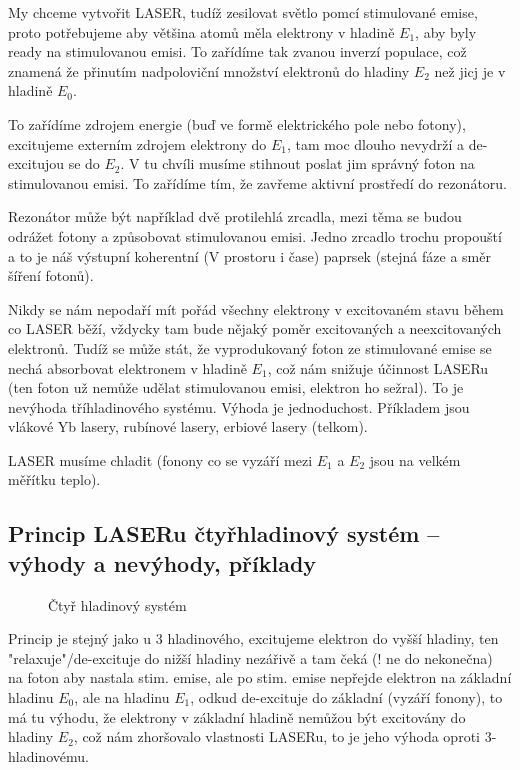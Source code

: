 \documentclass[a4paper, 12pt]{article}
\begin{document}
            My chceme vytvořit LASER, tudíž zesilovat světlo pomcí stimulované emise, proto potřebujeme aby většina atomů měla
            elektrony v hladině $E_1$, aby byly ready na stimulovanou emisi. To zařídíme tak zvanou inverzí populace,
            což znamená že přinutím nadpoloviční množství elektronů do hladiny $E_2$ než jicj je v hladině $E_0$.

            To zařídíme zdrojem energie (buď ve formě elektrického pole nebo fotony), excitujeme externím zdrojem elektrony
            do $E_1$, tam moc dlouho nevydrží a de-excitujou se do $E_2$. V tu chvíli musíme stihnout poslat jim správný foton
            na stimulovanou emisi. To zařídíme tím, že zavřeme aktivní prostředí do rezonátoru. 

            Rezonátor může být například dvě protilehlá zrcadla, mezi těma se budou odrážet fotony a způsobovat stimulovanou emisi.
            Jedno zrcadlo trochu propouští a to je náš výstupní koherentní (V prostoru i čase) paprsek (stejná fáze a směr šíření fotonů).

            Nikdy se nám nepodaří mít pořád všechny elektrony v excitovaném stavu během co LASER běží, vždycky tam bude nějaký poměr excitovaných a neexcitovaných elektronů.
            Tudíž se může stát, že vyprodukovaný foton ze stimulované emise se nechá absorbovat elektronem v hladině $E_1$, což nám snižuje účinnost LASERu (ten foton už nemůže udělat stimulovanou emisi, elektron ho sežral).
            To je nevýhoda tříhladinového systému. Výhoda je jednoduchost. Příkladem jsou vlákové Yb lasery, rubínové lasery, erbiové lasery (telkom).
            
            LASER musíme chladit (fonony co se vyzáří mezi $E_1$ a $E_2$ jsou na velkém měřítku teplo).  

        \subsection{Princip LASERu čtyřhladinový systém – výhody a nevýhody, příklady}
            \begin{figure}[H]
                \centering
                
                \caption{Čtyř hladinový systém}
            \end{figure}
            Princip je stejný jako u 3 hladinového, excitujeme elektron do vyšší hladiny,
            ten "relaxuje"/de-excituje do nižší hladiny nezářivě a tam čeká (! ne do nekonečna) na foton
            aby nastala stim. emise, ale po stim. emise nepřejde elektron na základní hladinu $E_0$,
            ale na hladinu $E_1$, odkud de-excituje do základní (vyzáří fonony), to má tu výhodu,
            že elektrony v základní hladině nemůžou být excitovány do hladiny $E_2$, což nám zhoršovalo
            vlastnosti LASERu, to je jeho výhoda oproti 3-hladinovému.
            
\end{document}
